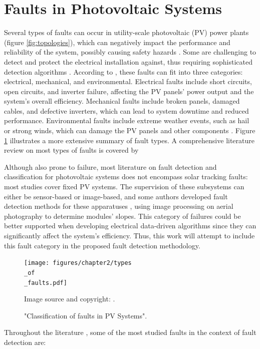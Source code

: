 \section{Faults in Photovoltaic Systems}

Several types of faults can occur in utility-scale photovoltaic (PV) power plants (figure \ref{fig:topologies}), which can negatively impact the performance and reliability of the system, possibly causing safety hazards \cite{Alam2015}. Some are challenging to detect and protect the electrical installation against, thus requiring sophisticated detection algorithms \cite{Pillai2018}. According to \cite{Pillai2018}, these faults can fit into three categories: electrical, mechanical, and environmental. Electrical faults include short circuits, open circuits, and inverter failure, affecting the PV panels' power output and the system's overall efficiency. Mechanical faults include broken panels, damaged cables, and defective inverters, which can lead to system downtime and reduced performance. Environmental faults include extreme weather events, such as hail or strong winds, which can damage the PV panels and other components \cite{faults}. Figure \ref{fig:faults} illustrates a more extensive summary of fault types. A comprehensive literature review on most types of faults is covered by 

Although also prone to failure, most literature on fault detection and classification for photovoltaic systems does not encompass solar tracking faults: most studies cover fixed PV systems. The supervision of these subsystems can either be sensor-based \cite{Stepanov2014} or image-based, and some authors developed fault detection methods for these apparatuses \cite{Amaral2021}, using image processing on aerial photography to determine modules' slopes. This category of failures could be better supported when developing electrical data-driven algorithms since they can significantly affect the system's efficiency. Thus, this work will attempt to include this fault category in the proposed fault detection methodology.

\begin{figure}[h]
    \centering
    \texttt{[image: figures/chapter2/types\\\_of\\\_faults.pdf]} \caption{"Classification of
    faults in PV Systems".} Image source and copyright: \cite{Pillai2018}.
    \label{fig:faults}
\end{figure}

Throughout the literature \cite{Braun2011}, some of the most studied faults in the context of fault detection are:

